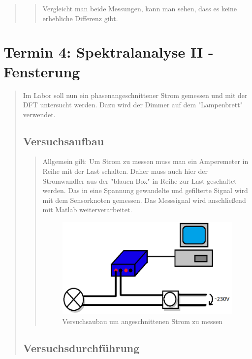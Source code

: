 \begin{quote}
\begin{quote}
	Vergleicht man beide Messungen, kann man sehen, dass es keine erhebliche
	Differenz gibt.
	
	 
	\end{quote}
\end{quote}

\section{Termin 4: Spektralanalyse II - Fensterung}
\begin{quote}

	Im Labor soll nun ein phasenangeschnittener Strom gemessen und mit der DFT untersucht werden.
	Dazu wird der Dimmer auf dem "Lampenbrett" verwendet.
	
	\subsection{Versuchsaufbau}
	\begin{quote}
	Allgemein gilt: Um Strom zu messen muss man ein Amperemeter in Reihe mit der Last schalten. 
	Daher muss auch hier der Stromwandler aus der "blauen Box" in Reihe zur Last geschaltet 
	werden. Das in eine Spannung gewandelte und gefilterte Signal wird mit dem Sensorknoten gemessen. 
	Das Messsignal wird anschließend mit Matlab weiterverarbeitet.

	\begin{figure}[htb]
	\centering
	\includegraphics[scale=0.6,  trim = 0cm 0cm 0cm 0cm,clip]{./Bilder/Versuchsaufbau1}
	\caption{Versuchsaubau um angeschnittenen Strom zu messen}
	\end{figure}
	
	\end{quote}
		

		
	\subsection{Versuchsdurchführung}
	\begin{quote}
		

\end{quote}
\end{quote}
